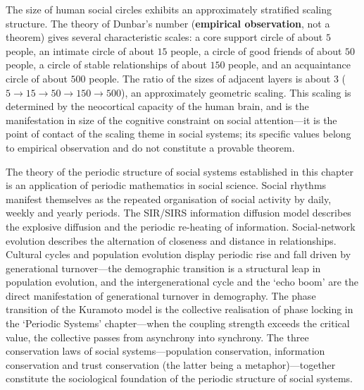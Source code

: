 \begin{remark}\label{ch27_dunbar_scaling}
The size of human social circles exhibits an approximately stratified scaling structure. The theory of Dunbar's number (\textbf{empirical observation}, not a theorem) gives several characteristic scales: a core support circle of about $5$ people, an intimate circle of about $15$ people, a circle of good friends of about $50$ people, a circle of stable relationships of about $150$ people, and an acquaintance circle of about $500$ people. The ratio of the sizes of adjacent layers is about $3$ ($5\to15\to50\to150\to500$), an approximately geometric scaling. This scaling is determined by the neocortical capacity of the human brain, and is the manifestation in size of the cognitive constraint on social attention---it is the point of contact of the scaling theme in social systems; its specific values belong to empirical observation and do not constitute a provable theorem.
\end{remark}

\begin{remark}
The theory of the periodic structure of social systems established in this chapter is an application of periodic mathematics in social science. Social rhythms manifest themselves as the repeated organisation of social activity by daily, weekly and yearly periods. The SIR/SIRS information diffusion model describes the explosive diffusion and the periodic re-heating of information. Social-network evolution describes the alternation of closeness and distance in relationships. Cultural cycles and population evolution display periodic rise and fall driven by generational turnover---the demographic transition is a structural leap in population evolution, and the intergenerational cycle and the `echo boom' are the direct manifestation of generational turnover in demography. The phase transition of the Kuramoto model is the collective realisation of phase locking in the `Periodic Systems' chapter---when the coupling strength exceeds the critical value, the collective passes from asynchrony into synchrony. The three conservation laws of social systems---population conservation, information conservation and trust conservation (the latter being a metaphor)---together constitute the sociological foundation of the periodic structure of social systems.
\end{remark}


